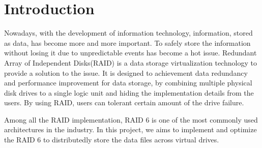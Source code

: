\section{Introduction}

Nowadays, with the development of information technology, information, stored as data, has become more and more important. To safely store the information without losing it due to unpredictable events has become a hot issue. Redundant Array of Independent Disks(RAID) is a data storage virtualization technology to provide a solution to the issue. It is designed to achievement data redundancy and performance improvement for data storage, by combining multiple physical disk drives to a single logic unit and hiding the implementation details from the users. By using RAID, users can tolerant certain amount of the drive failure.

Among all the RAID implementation, RAID 6 is one of the most commonly used architectures in the industry.  
In this project, we aims to implement and optimize the RAID 6 to distributedly store the data files across virtual drives.